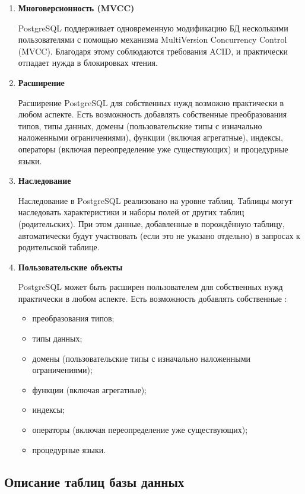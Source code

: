 \begin{enumerate}
    \item \textbf{Многоверсионность (MVCC)}

    \tab PostgreSQL поддерживает одновременную модификацию БД несколькими пользователями с помощью механизма MultiVersion Concurrency Control (MVCC). Благодаря этому соблюдаются требования ACID, и практически отпадает нужда в блокировках чтения.


    \item \textbf{Расширение}

    \tab Расширение PostgreSQL для собственных нужд возможно практически в любом аспекте. Есть возможность добавлять собственные преобразования типов, типы данных, домены (пользовательские типы с изначально наложенными ограничениями), функции (включая агрегатные), индексы, операторы (включая переопределение уже существующих) и процедурные языки.


    \item \textbf{Наследование}

    \tab Наследование в PostgreSQL реализовано на уровне таблиц. Таблицы могут наследовать характеристики и наборы полей от других таблиц (родительских). При этом данные, добавленные в порождённую таблицу, автоматически будут участвовать (если это не указано отдельно) в запросах к родительской таблице.


    \item \textbf{Пользовательские объекты}

    \tab PostgreSQL может быть расширен пользователем для собственных нужд практически в любом аспекте. Есть возможность добавлять собственные \cite{web-creator}:
    \begin{itemize}
        \item преобразования типов;
        \item типы данных;
        \item домены (пользовательские типы с изначально наложенными ограничениями);
        \item функции (включая агрегатные);
        \item индексы;
        \item операторы (включая переопределение уже существующих);
        \item процедурные языки.
    \end{itemize}
\end{enumerate}


\subsection{Описание таблиц базы данных}


